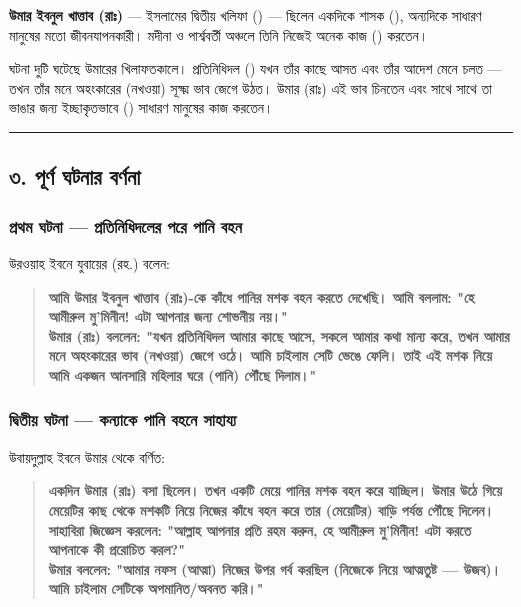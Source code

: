 \textbf{উমার ইবনুল খাত্তাব (রাঃ)} — ইসলামের দ্বিতীয় খলিফা () — ছিলেন একদিকে শাসক (), অন্যদিকে সাধারণ মানুষের মতো জীবনযাপনকারী। মদীনা ও পার্শ্ববর্তী অঞ্চলে তিনি নিজেই অনেক কাজ () করতেন।

ঘটনা দুটি ঘটেছে উমারের খিলাফতকালে। প্রতিনিধিদল () যখন তাঁর কাছে আসত এবং তাঁর আদেশ মেনে চলত — তখন তাঁর মনে অহংকারের (নখওয়া) সূক্ষ্ম ভাব জেগে উঠত। উমার (রাঃ) এই ভাব চিনতেন এবং সাথে সাথে তা ভাঙার জন্য ইচ্ছাকৃতভাবে () সাধারণ মানুষের কাজ করতেন।

\medskip\hrule\medskip

\subsection*{৩. পূর্ণ ঘটনার বর্ণনা}

\subsubsection*{প্রথম ঘটনা — প্রতিনিধিদলের পরে পানি বহন}

উরওয়াহ ইবনে যুবায়ের (রহ.) বলেন:

\begin{quote}
\textbf{আমি উমার ইবনুল খাত্তাব (রাঃ)-কে কাঁধে পানির মশক বহন করতে দেখেছি। আমি বললাম: "হে আমীরুল মু'মিনীন! এটা আপনার জন্য শোভনীয় নয়।"} \\
\textbf{উমার (রাঃ) বললেন: "যখন প্রতিনিধিদল আমার কাছে আসে, সকলে আমার কথা মান্য করে, তখন আমার মনে অহংকারের ভাব (নখওয়া) জেগে ওঠে। আমি চাইলাম সেটি ভেঙে ফেলি। তাই এই মশক নিয়ে আমি একজন আনসারি মহিলার ঘরে (পানি) পৌঁছে দিলাম।"}
\end{quote}

\subsubsection*{দ্বিতীয় ঘটনা — কন্যাকে পানি বহনে সাহায্য}

উবায়দুল্লাহ ইবনে উমার থেকে বর্ণিত:

\begin{quote}
\textbf{একদিন উমার (রাঃ) বসা ছিলেন। তখন একটি মেয়ে পানির মশক বহন করে যাচ্ছিল। উমার উঠে গিয়ে মেয়েটির কাছ থেকে মশকটি নিয়ে নিজের কাঁধে বহন করে তার (মেয়েটির) বাড়ি পর্যন্ত পৌঁছে দিলেন।} \\
\textbf{সাহাবিরা জিজ্ঞেস করলেন: "আল্লাহ আপনার প্রতি রহম করুন, হে আমীরুল মু'মিনীন! এটা করতে আপনাকে কী প্ররোচিত করল?"} \\
\textbf{উমার বললেন: "আমার নফস (আত্মা) নিজের উপর গর্ব করছিল (নিজেকে নিয়ে আত্মতুষ্ট — উজব)। আমি চাইলাম সেটিকে অপমানিত/অবনত করি।"}
\end{quote}

